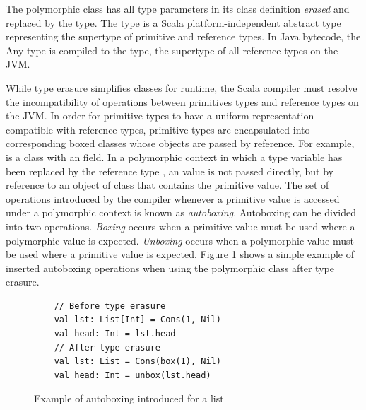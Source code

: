 The polymorphic  class has all type parameters in its class definition \textit{erased} and replaced by the  type.
The  type is a Scala platform-independent\cite{scala:overview} abstract type representing the supertype of primitive and reference types.
In Java bytecode, the {Any} type is compiled to the  type, the supertype of all reference types on the JVM.

While type erasure simplifies classes for runtime, the Scala compiler must resolve the incompatibility of operations between primitives types and reference types on the JVM\cite{java:vm-spec}.
In order for primitive types to have a uniform representation compatible with reference types, primitive types are encapsulated into corresponding boxed classes whose objects are passed by reference.
For example,  is a class with an  field.
In a polymorphic context in which a type variable has been replaced by the reference type , an  value is not passed directly, but by reference to an object of class  that contains the primitive value.
The set of operations introduced by the compiler whenever a primitive value is accessed under a polymorphic context is known as \textit{autoboxing}\cite{java:autoboxing}. 
Autoboxing can be divided into two operations.
\textit{Boxing} occurs when a primitive value must be used where a polymorphic value is expected.
\textit{Unboxing} occurs when a polymorphic value must be used where a primitive value is expected.
Figure \ref{example:autoboxing} shows a simple example of inserted autoboxing operations when using the polymorphic  class after type erasure.

\begin{figure}[!htb]
	\begin{verbatim}
	// Before type erasure 	
	val lst: List[Int] = Cons(1, Nil)
	val head: Int = lst.head
	// After type erasure
	val lst: List = Cons(box(1), Nil)
	val head: Int = unbox(lst.head) 
	\end{verbatim}
	\caption{Example of autoboxing introduced for a list}
	\label{example:autoboxing}
\end{figure}

